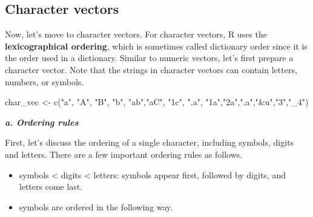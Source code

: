 \documentclass[
]{book}
\newenvironment{Shaded}{\begin{snugshade}}{\end{snugshade}}
\newcommand{\FunctionTok}[1]{\textcolor[rgb]{0.00,0.00,0.00}{#1}}
\newcommand{\NormalTok}[1]{#1}
\newcommand{\OtherTok}[1]{\textcolor[rgb]{0.56,0.35,0.01}{#1}}
\newcommand{\StringTok}[1]{\textcolor[rgb]{0.31,0.60,0.02}{#1}}
\providecommand{\tightlist}{%
  \setlength{\itemsep}{0pt}\setlength{\parskip}{0pt}}
\begin{document}
\hypertarget{sort-character}{%
\subsection{Character vectors}\label{sort-character}}

Now, let's move to character vectors. For character vectors, R uses the \textbf{lexicographical ordering}, which is sometimes called dictionary order since it is the order used in a dictionary. Similar to numeric vectors, let's first prepare a character vector. Note that the strings in character vectors can contain letters, numbers, or symbols.

\begin{Shaded}
\begin{Highlighting}[]
\NormalTok{char\_vec }\OtherTok{\textless{}{-}} \FunctionTok{c}\NormalTok{(}\StringTok{"a"}\NormalTok{, }\StringTok{"A"}\NormalTok{, }\StringTok{"B"}\NormalTok{, }\StringTok{"b"}\NormalTok{, }\StringTok{"ab"}\NormalTok{,}\StringTok{"aC"}\NormalTok{, }\StringTok{"1c"}\NormalTok{, }\StringTok{".a"}\NormalTok{, }\StringTok{"1a"}\NormalTok{,}\StringTok{"2a"}\NormalTok{,}\StringTok{".a"}\NormalTok{,}\StringTok{"\&u"}\NormalTok{,}\StringTok{"3"}\NormalTok{,}\StringTok{"\_4"}\NormalTok{)}
\end{Highlighting}
\end{Shaded}

\textbf{\emph{a. Ordering rules}}

First, let's discuss the ordering of a single character, including symbols, digits and letters.
There are a few important ordering rules as follows.

\begin{itemize}
\tightlist
\item
  symbols \textless{} digits \textless{} letters: symbols appear first, followed by digits, and letters come last.
\item
  symbols are ordered in the following way.
\end{itemize}
\end{document}
